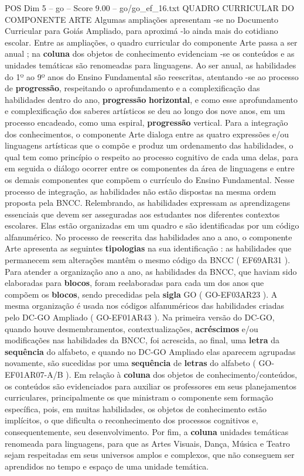 \begin{textsample}{POS Dim 5 – go – Score 9.00 – go/go\_ef\_16.txt}  \label{ex:f5_pos_007}
QUADRO CURRICULAR DO COMPONENTE ARTE Algumas ampliações apresentam -se no Documento Curricular para Goiás Ampliado, para aproximá -lo ainda mais do cotidiano escolar.
Entre as ampliações, o quadro curricular do componente Arte passa a ser anual ; na \textbf{coluna} dos objetos de conhecimento evidenciam -se os conteúdos e as unidades temáticas são renomeadas para linguagens.
Ao ser anual, as habilidades do 1º ao 9º anos do Ensino Fundamental são reescritas, atentando -se ao processo de \textbf{progressão}, respeitando o aprofundamento e a complexificação das habilidades dentro do ano, \textbf{progressão} \textbf{horizontal}, e como esse aprofundamento e complexificação dos saberes artísticos se deu ao longo dos nove anos, em um processo encadeado, como uma espiral, \textbf{progressão} vertical.
Para a integração dos conhecimentos, o componente Arte dialoga entre as quatro expressões e/ou linguagens artísticas que o compõe e produz um ordenamento das habilidades, o qual tem como princípio o respeito ao processo cognitivo de cada uma delas, para em seguida o diálogo ocorrer entre os componentes da área de linguagens e entre os demais componentes que compõem o currículo do Ensino Fundamental.
Nesse processo de integração, as habilidades não estão dispostas na mesma ordem proposta pela BNCC.
Relembrando, as habilidades expressam as aprendizagens essenciais que devem ser asseguradas aos estudantes nos diferentes contextos escolares.
Elas estão organizadas em um quadro e são identificadas por um código alfanumérico.
No processo de reescrita das habilidades ano a ano, o componente Arte apresenta as seguintes \textbf{tipologias} na sua identificação : as habilidades que permanecem sem alterações mantêm o mesmo código da BNCC ( EF69AR31 ).
Para atender a organização ano a ano, as habilidades da BNCC, que haviam sido elaboradas para \textbf{blocos}, foram reelaboradas para cada um dos anos que compõem os \textbf{blocos}, sendo precedidas pela \textbf{sigla} GO ( GO-EF03AR23 ).
A mesma organização é usada nos códigos alfanuméricos das habilidades criadas pelo DC-GO Ampliado ( GO-EF01AR43 ).
Na primeira versão do DC-GO, quando houve desmembramentos, contextualizações, \textbf{acréscimos} e/ou modificações nas habilidades da BNCC, foi acrescida, ao final, uma \textbf{letra} da \textbf{sequência} do alfabeto, e quando no DC-GO Ampliado elas aparecem agrupadas novamente, são sucedidas por uma \textbf{sequência} de \textbf{letras} do alfabeto ( GO-EF01AR07-A/B ).
Em relação à \textbf{coluna} dos objetos de conhecimento/conteúdos, os conteúdos são evidenciados para auxiliar os professores em seus planejamentos curriculares, principalmente os que ministram o componente sem formação específica, pois, em muitas habilidades, os objetos de conhecimento estão implícitos, o que dificulta o reconhecimento dos processos cognitivos e, consequentemente, seu desenvolvimento.
Por fim, a \textbf{coluna} unidades temáticas renomeada para linguagens, para que as Artes Visuais, Dança, Música e Teatro sejam respeitadas em seus universos amplos e complexos, que não conseguem ser aprendidos no tempo e espaço de uma unidade temática.

\end{textsample}

